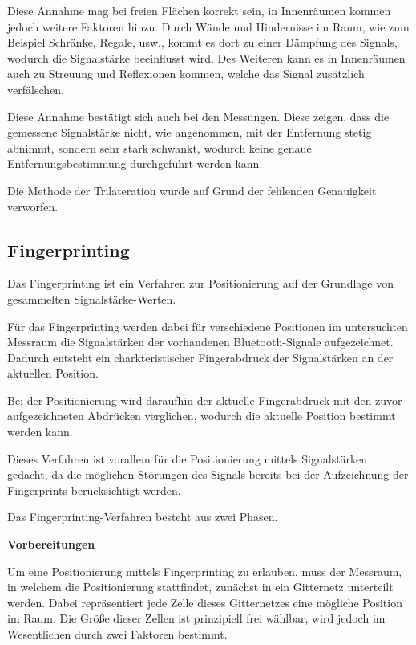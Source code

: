 Diese Annahme mag bei freien Flächen korrekt sein, in Innenräumen kommen jedoch weitere Faktoren hinzu. 
Durch Wände und Hindernisse im Raum, wie zum Beispiel Schränke, Regale, usw., kommt es dort zu einer Dämpfung des Signals, wodurch die Signalstärke beeinflusst wird. Des Weiteren kann es in Innenräumen auch zu Streuung und Reflexionen kommen, welche das Signal zusätzlich verfälschen.

Diese Annahme bestätigt sich auch bei den Messungen. Diese zeigen, dass die gemessene Signalstärke nicht, wie angenommen, mit der Entfernung stetig abnimmt, sondern sehr stark schwankt, wodurch keine genaue Entfernungsbestimmung durchgeführt werden kann.

Die Methode der Trilateration wurde auf Grund der fehlenden Genauigkeit verworfen. 

\subsection{Fingerprinting}
\label{sec:implementation:positioning:fingerprinting}
Das Fingerprinting ist ein Verfahren zur Positionierung auf der Grundlage von gesammelten Signalstärke-Werten.

Für das Fingerprinting werden dabei für verschiedene Positionen im untersuchten Messraum die Signalstärken der vorhandenen Bluetooth-Signale aufgezeichnet. 
Dadurch entsteht ein charkteristischer Fingerabdruck der Signalstärken an der aktuellen Position.

Bei der Positionierung wird daraufhin der aktuelle Fingerabdruck mit den zuvor aufgezeichneten Abdrücken verglichen, wodurch die aktuelle Position bestimmt werden kann.

Dieses Verfahren ist vorallem für die Positionierung mittels Signalstärken gedacht, da die möglichen Störungen des Signals bereits bei der Aufzeichnung der Fingerprints berücksichtigt werden.

Das Fingerprinting-Verfahren besteht aus zwei Phasen.


\textbf{Vorbereitungen}

Um eine Positionierung mittels Fingerprinting zu erlauben, muss der Messraum, in welchem die Positionierung stattfindet, zunächst in ein Gitternetz unterteilt werden. Dabei repräsentiert jede Zelle dieses Gitternetzes eine mögliche Position im Raum.
Die Größe dieser Zellen ist prinzipiell frei wählbar, wird jedoch im Wesentlichen durch zwei Faktoren bestimmt. 

